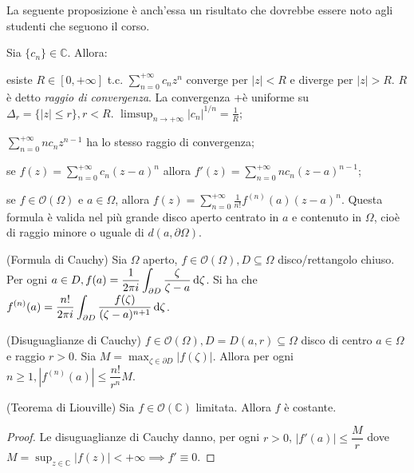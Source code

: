La seguente proposizione è anch'essa un risultato che dovrebbe essere noto agli studenti che seguono il corso.

\begin{prop}
  Sia $\{c_n\} \in \mathbb{C}$. Allora:
  \begin{nlist}
    \item esiste $R \in [0, +\infty]$ t.c. $\displaystyle \sum_{n=0}^{+\infty} c_nz^n$ converge per $|z|<R$ e diverge per $|z|>R$. $R$ è detto \textit{raggio di convergenza}. La convergenza +è uniforme su $\Delta_r=\{|z| \le r\}, r<R$. $\displaystyle \limsup_{n \rightarrow +\infty} |c_n|^{1/n}=\frac{1}{R}$;
    \item $\displaystyle \sum_{n=0}^{+\infty} nc_nz^{n-1}$ ha lo stesso raggio di convergenza;
    \item se $\displaystyle f(z)=\sum_{n=0}^{+\infty} c_n(z-a)^n$ allora $f'(z)=\sum_{n=0}^{+\infty} nc_n(z-a)^{n-1}$;
    \item se $f \in \mathcal{O}(\Omega)$ e $a \in \Omega$, allora $\displaystyle f(z)=\sum_{n=0}^{+\infty} \frac{1}{n!}f^{(n)}(a)(z-a)^n$. Questa formula è valida nel più grande disco aperto centrato in $a$ e contenuto in $\Omega$, cioè di raggio minore o uguale di $d(a, \partial \Omega)$.
  \end{nlist}
\end{prop}

\begin{thm}
  (Formula di Cauchy) Sia $\Omega$ aperto, $f \in \mathcal{O}(\Omega), D \subseteq \Omega$ disco/rettangolo chiuso. Per ogni $\displaystyle a \in D, f(a)=\frac{1}{2\pi i} \int_{\partial D} \frac{\zeta}{\zeta-a} \mathop{}\!\mathrm{d}\zeta$.
  Si ha che $\displaystyle f^{(n)}(a)=\frac{n!}{2\pi i} \int_{\partial D} \frac{f(\zeta)}{(\zeta-a)^{n+1}}\mathop{}\!\mathrm{d} \zeta$.
\end{thm}

\begin{cor}
  (Disuguaglianze di Cauchy) $f \in \mathcal{O}(\Omega), D=D(a, r) \subseteq \Omega$ disco di centro $a \in \Omega$ e raggio $r>0$. Sia $\displaystyle M=\max_{\zeta \in \partial D} |f(\zeta)|$. Allora per ogni $n \ge 1, |f^{(n)}(a)| \le \dfrac{n!}{r^n}M$.
\end{cor}

\begin{cor}
  (Teorema di Liouville) Sia $f \in \mathcal{O}(\mathbb{C})$ limitata. Allora $f$ è costante.
\end{cor}

\begin{proof}
  Le disuguaglianze di Cauchy danno, per ogni $r>0$, $|f'(a)| \le \dfrac{M}{r}$ dove $\displaystyle M=\sup_{z \in \mathbb{C}} |f(z)|<+\infty \implies
  f' \equiv 0$.
\end{proof}

